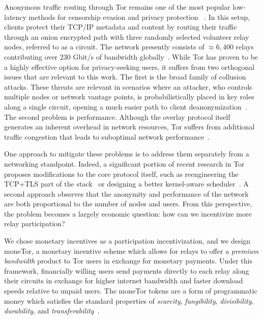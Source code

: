 Anonymous traffic routing through Tor remains one of the most popular
low-latency methods for censorship evasion and privacy protection
~\cite{dingledine2004tor}. In this setup, clients protect their TCP/IP metadata
and content by routing their traffic through an onion encrypted path with three
randomly selected volunteer relay nodes, referred to as a circuit. The network
presently consists of $\approx 6,400$ relays contributing over 230 Gbit/s of
bandwidth globally~\cite{portal2018tormetrics}. While Tor has proven to be a
highly effective option for privacy-seeking users, it suffers from two
orthogonal issues that are relevant to this work. The first is the broad family
of collusion attacks. These threats are relevant in scenarios where an attacker,
who controls multiple nodes or network vantage points, is probabilistically
placed in key roles along a single circuit, opening a much easier path to client
deanonymization~\cite{wright2004predecessor,murdoch2005low}. The second problem
is performance. Although the overlay protocol itself generates an inherent
overhead in network resources, Tor suffers from additional traffic congestion
that leads to suboptimal network performance~\cite{portal2018tormetrics,
  alsabah2016performance}.

One approach to mitigate these problems is to address them separately from a
networking standpoint. Indeed, a significant portion of recent research in Tor
proposes modifications to the core protocol itself, such as reengineering the
TCP+TLS part of the stack~\cite{reardon2009improving} or designing a better
kernel-aware scheduler~\cite{jansen2014never}. A second approach observes that
the anonymity and performance of the network are both proportional to the number
of nodes and users. From this perspective, the problem becomes a largely
economic question: how can we incentivize more relay participation? 

We chose monetary incentives as a participation incentivization, and we design moneTor, a monetary incentive scheme which allows for relays to offer a \emph{premium bandwidth} product
to Tor users in exchange for monetary payments. Under this framework,
financially willing users send payments directly to each relay along their circuits
in exchange for higher internet bandwidth and faster download speeds relative to
unpaid users. %
The moneTor tokens %
are a form of programmatic money which satisfies the standard properties of
\textit{scarcity}, \textit{fungibility}, \textit{divisibility},
\textit{durability}, and
\textit{transferability}~\cite[p.3]{crump2011phenomenon}.

